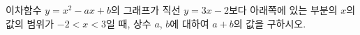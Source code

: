 이차함수 $y=x^2-ax+b$의 그래프가 직선 $y=3x-2$보다 아래쪽에 있는 부분의 $x$의 값의 범위가 $-2<x<3$일 때, 상수 $a$, $b$에 대하여 $a+b$의 값을 구하시오.
